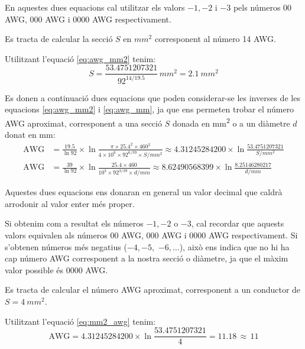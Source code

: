 En aquestes dues equacions cal utilitzar els valors $-1, -2$ i $-3$  pels números 00 AWG,
000 AWG i 0000 AWG respectivament.


\begin{exemple}\label{ex:AWGammSQ}
	\addcontentsxms{\AWGammSQ}
    Es tracta de calcular la secció $S$ en $\unit{mm^2}$ corresponent al número 14 AWG.

    Utilitzant l'equació \eqref{eq:awg_mm2} tenim:
    \[
        S = \dfrac{\num{53,4751207321}}{92^{14/\num{19,5}}} 
        \,\unit{mm^2} = \qty{2,1}{mm^2}
    \]
\end{exemple}


Es donen a continuació dues equacions que poden considerar-se les inverses de les equacions \eqref{eq:awg_mm2} i \eqref{eq:awg_mm}, ja que ens permeten trobar el número AWG aproximat, corresponent a una secció $S$ donada en \unit{mm^2} o a un diàmetre $d$ donat en \unit{mm}:
\begin{align}
   \text{AWG} &= \frac{\num{19,5}}{\ln 92} \times \ln \frac{\pi \times
   \num{25,4}^2 \times 460^2}{4 \times 10^6 \times 92^{6/39} \times S/{\scriptstyle\unit{mm^2}}} \approx
   \num{4,31245284200} \times \ln \frac{\num{53,4751207321}}{S/{\scriptstyle\unit{mm^2}}}\label{eq:mm2_awg} \\[2ex]
   \text{AWG} &= \frac{39}{\ln 92} \times \ln \frac{\num{25,4} \times 460}{10^3 \times 92^{3/39} \times d/{\scriptstyle\unit{mm}}} \approx
   \num{8,62490568399} \times \ln \frac{\num{8,25146280217}}{d/{\scriptstyle\unit{mm}}}\label{eq:mm_awg}
\end{align}

Aquestes dues equacions ens donaran en general un valor decimal que caldrà arrodonir al valor enter  més proper.

Si obtenim com a resultat els números $-1, -2$ o $-3$, cal recordar que aquests valors equivalen als números 00 AWG,
000 AWG i 0000 AWG respectivament. Si s'obtenen números més negatius ($-4, -5,$ $-6, \dots$), això ens indica que no hi ha cap número AWG corresponent a la nostra secció o diàmetre, ja que el màxim valor possible és 0000 AWG.



\begin{exemple}\label{ex:mmSQaAWG}
	\addcontentsxms{\mmSQaAWG}
    Es tracta de calcular el número AWG aproximat, corresponent a un conductor de $S=\qty{4}{mm^2}$.

    Utilitzant l'equació \eqref{eq:mm2_awg} tenim:
    \[
        \text{AWG} = \num{4,31245284200} \times \ln \dfrac{\num{53,4751207321}}{4} =
        \num{11,18} \, \approx \, 11
    \]
\end{exemple}


